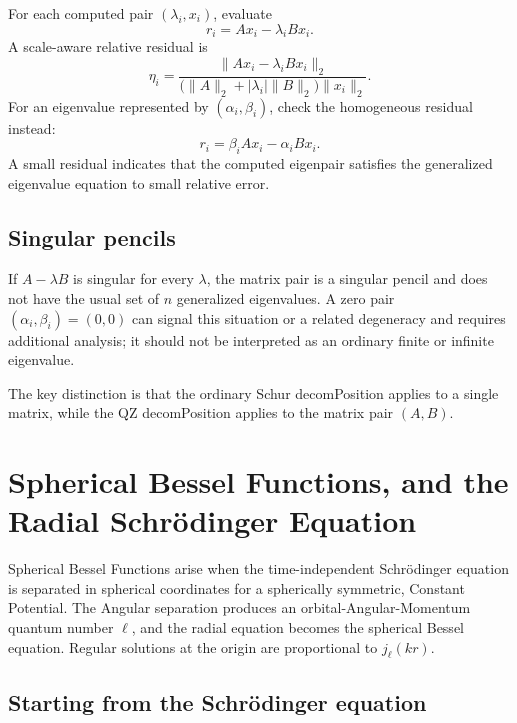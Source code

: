 \documentclass[a4paper, 10pt, onepage]{elegantbook}
\begin{document}
{\noindent

For each computed pair \((\lambda_i,x_i)\), evaluate
\[
r_i=Ax_i-\lambda_iBx_i.
\]
A scale-aware relative residual is
\[
\eta_i=
\frac{\|Ax_i-\lambda_iBx_i\|_2}
{\bigl(\|A\|_2+|\lambda_i|\|B\|_2\bigr)\|x_i\|_2}.
\]
For an eigenvalue represented by \((\alpha_i,\beta_i)\), check the
homogeneous residual instead:
\[
r_i=\beta_iAx_i-\alpha_iBx_i.
\]
A small residual indicates that the computed eigenpair satisfies the
generalized eigenvalue equation to small relative error.

\subsection{Singular pencils}

\noindent

If \(A-\lambda B\) is singular for every \(\lambda\), the matrix pair
is a singular pencil and does not have the usual set of \(n\)
generalized eigenvalues. A zero pair \((\alpha_i,\beta_i)=(0,0)\)
can signal this situation or a related degeneracy and requires
additional analysis; it should not be interpreted as an ordinary
finite or infinite eigenvalue.  

The key distinction is that the ordinary Schur decomPosition applies to a single matrix, 
while the QZ decomPosition applies to the matrix pair \((A,B)\).


\section{Spherical Bessel Functions, and the Radial Schr\"odinger Equation}

\noindent


Spherical Bessel Functions arise when the time-independent
Schr\"odinger equation is separated in spherical coordinates for a
spherically symmetric, Constant Potential. The Angular separation
produces an orbital-Angular-Momentum quantum number $\ell$, and the
radial equation becomes the spherical Bessel equation. Regular
solutions at the origin are proportional to $j_\ell(kr)$.


\subsection{Starting from the Schr\"odinger equation}

\noindent

}
\end{document}
